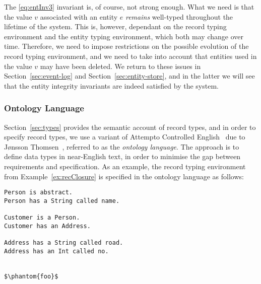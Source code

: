 The \ref{eq:entInv3} invariant is, of course, not strong enough. What
we need is that the value $v$ associated with an entity $e$
\emph{remains} well-typed throughout the lifetime of the system. This
is, however, dependant on the record typing environment and the entity
typing environment, which both may change over time. Therefore, we
need to impose restrictions on the possible evolution of the record
typing environment, and we need to take into account that entities
used in the value $v$ may have been deleted. We return to these issues
in Section~\ref{sec:event-log} and Section~\ref{sec:entity-store}, and
in the latter we will see that the entity integrity invariants are
indeed satisfied by the system.

\subsubsection{Ontology Language}

Section~\ref{sec:types} provides the semantic account of record types,
and in order to specify record types, we use a variant of Attempto
Controlled English~\cite{norbert08lncs} due to J\o{}nsson
Thomsen~\cite{jonssonthomsen10master}, referred to as the
\emph{ontology language}. The approach is to define data types in
near-English text, in order to minimise the gap between requirements
and specification. As an example, the record typing environment from
Example~\ref{ex:recClosure} is specified in the ontology language as
follows:
\begin{lstlisting}[language=ontology,basicstyle=\normalsize,multicols=2]
Person is abstract.
Person has a String called name.

Customer is a Person.
Customer has an Address.

Address has a String called road.
Address has an Int called no.


$\phantom{foo}$
\end{lstlisting}

